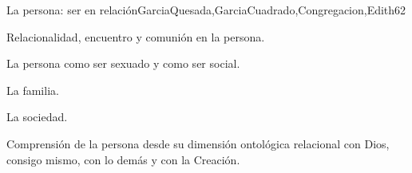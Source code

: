 \begin{syllabus}
\begin{unit}{La persona: ser en relación}{GarciaQuesada,GarciaCuadrado,Congregacion,Edith}{6}{2}
\begin{topics}
 	 	 		\item Relacionalidad, encuentro y comunión en la persona.
 	 	 		\item La persona como ser sexuado y como ser social.
 	 	 		\item La familia.
 	 	 		\item La sociedad.
\end{topics}

\begin{learningoutcomes}
	\item Comprensión de la persona desde su dimensión ontológica relacional con Dios, consigo mismo, con lo demás y con la Creación.
\end{learningoutcomes}
\end{unit}



\begin{coursebibliography}
\end{coursebibliography}

\end{syllabus}
